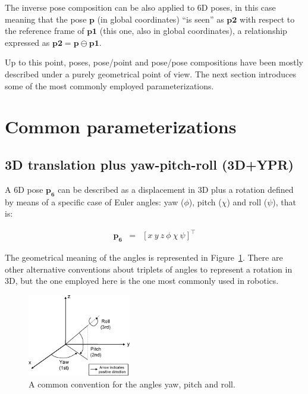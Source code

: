\documentclass[a4paper,11pt]{report}
\begin{document}
The inverse pose composition can be also applied to 6D poses, in this case meaning that
the pose $\mathbf{p}$ (in global coordinates) ``is seen'' as $\mathbf{p2}$ with respect
to the reference frame of $\mathbf{p1}$ (this one, also in global coordinates), a 
relationship expressed as $\mathbf{p2} = \mathbf{p} \ominus \mathbf{p1}$.


Up to this point, poses, pose/point and pose/pose compositions have been mostly described 
under a purely geometrical point of view. 
The next section introduces some of the most commonly employed parameterizations.


\newpage

\section{Common parameterizations}


\subsection{3D translation plus yaw-pitch-roll (3D+YPR)}

A 6D pose $\mathbf{p_6}$ can be described as a displacement in 3D plus a rotation defined by 
means of a specific case of Euler angles: yaw ($\phi$), pitch
($\chi$) and roll ($\psi$), that is:

\begin{eqnarray}
\mathbf{p_6} &=& [x ~ y ~ z ~ \phi ~ \chi ~ \psi]^\top
\end{eqnarray}

The geometrical meaning of the angles is represented in Figure~\ref{fig:ypr}. 
There are other alternative conventions about triplets of angles to represent a rotation in 3D, but
the one employed here is the one most commonly used in robotics. 

\begin{figure}[h]
\centering
\includegraphics[width=0.40\textwidth]{fig1.eps}
\caption{A common convention for the angles yaw, pitch and roll.}
\label{fig:ypr}
\end{figure}
\end{document}
